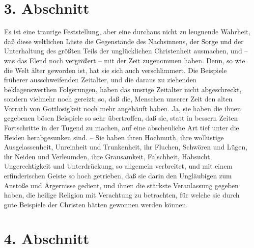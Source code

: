 \section{3. Abschnitt} \label{kap1_ab3}

Es ist eine traurige Feststellung, aber eine durchaus nicht zu leugnende
Wahrheit, daß diese weltlichen Lüste die Gegenstände des Nachsinnens, der Sorge
und der Unterhaltung des größten Teils der unglücklichen Christenheit ausmachen,
und -- was das Elend noch vergrößert -- mit der Zeit zugenommen haben. Denn, so
wie die Welt älter geworden ist, hat sie sich auch verschlimmert. Die Beispiele
früherer ausschweifenden Zeitalter, und die daraus zu ziehenden beklagenswerthen
Folgerungen, haben das unsrige Zeitalter nicht abgeschreckt, sondern vielmehr
noch gereizt; so, daß die, Menschen unserer Zeit den alten Vorrath von
Gottlosigkeit noch mehr angehäuft haben. Ja, sie haben die ihnen gegebenen bösen
Beispiele so sehr übertroffen, daß sie, statt in bessern Zeiten Fortschritte in
der Tugend zu machen, auf eine abscheuliche Art tief unter die Heiden
herabgesunken sind. --
Sie haben ihren Hochmuth, ihre wollüstige
Ausgelassenheit, Unreinheit und Trunkenheit, ihr Fluchen, Schwören und Lügen,
ihr Neiden und Verleumden, ihre Grausamkeit, Falschheit, Habsucht,
Ungerechtigkeit und Unterdrückung, so allgemein verbreitet, und mit einem
erfinderischen Geiste so hoch getrieben, daß sie darin den Ungläubigen zum
Anstoße und Ärgernisse gedient, und ihnen die stärkste Veranlassung gegeben
haben, die heilige Religion mit Verachtung zu betrachten, für welche sie durch
gute Beispiele der Christen hätten gewonnen werden können.

\section{4. Abschnitt} \label{kap1_ab4}

